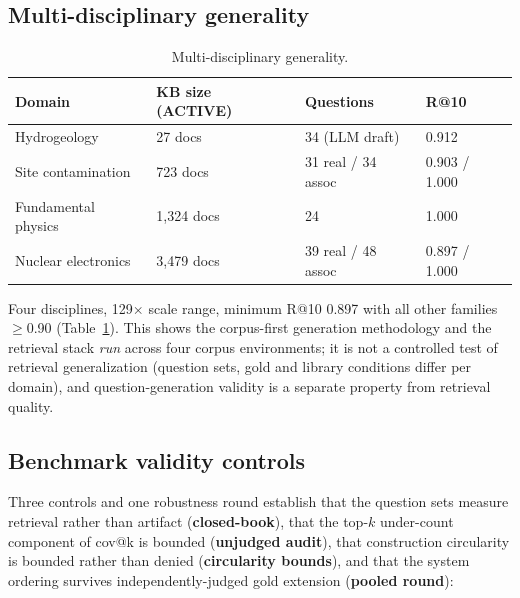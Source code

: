 \documentclass[sigconf,nonacm]{acmart}
\begin{document}
\subsection{Multi-disciplinary generality}

\begin{table}[!t]
\centering
\caption{Multi-disciplinary generality.}
\label{tab:generality}
\begin{tabular}{llll}
\toprule
Domain & KB size (ACTIVE) & Questions & R@10 \\
\midrule
Hydrogeology & 27 docs & 34 (LLM draft) & 0.912 \\
Site contamination & 723 docs & 31 real / 34 assoc & 0.903 / 1.000 \\
Fundamental physics & 1{,}324 docs & 24 & 1.000 \\
Nuclear electronics & 3{,}479 docs & 39 real / 48 assoc & 0.897 / 1.000 \\
\bottomrule
\end{tabular}
\end{table}

Four disciplines, 129$\times$ scale range, minimum R@10 0.897 with all
other families $\geq$0.90 (Table~\ref{tab:generality}). This shows the
corpus-first generation methodology and the retrieval stack \emph{run}
across four corpus environments; it is not a controlled test of retrieval
generalization (question sets, gold and library conditions differ per
domain), and question-generation validity is a separate property from
retrieval quality.

\subsection{Benchmark validity controls}

Three controls and one robustness round establish that the question sets
measure retrieval rather than artifact (\textbf{closed-book}), that the
top-$k$ under-count component of cov@k is bounded (\textbf{unjudged
audit}), that construction circularity is bounded rather than denied
(\textbf{circularity bounds}), and that the system ordering survives
independently-judged gold extension (\textbf{pooled round}):
\end{document}
